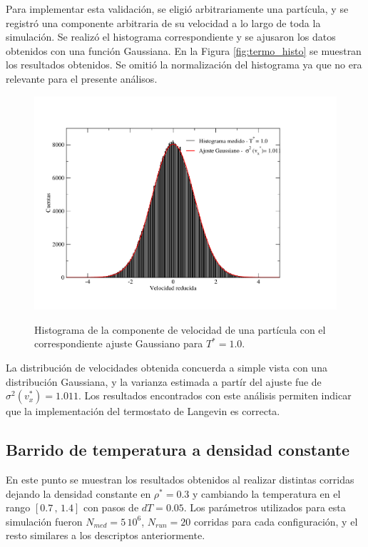 \documentclass[a4paper,12pt]{article}
\begin{document}
Para implementar esta validación, se eligió arbitrariamente una partícula, y se 
registró una componente arbitraria de su velocidad a lo largo de toda la 
simulación. Se realizó el histograma correspondiente y se ajusaron los datos 
obtenidos con una función Gaussiana. En la Figura \eqref{fig:termo_histo} se 
muestran los resultados obtenidos. Se omitió la normalización del histograma ya 
que no era relevante para el presente análisos.

\begin{figure}[H]\label{fig:termo_histo}
  \centering
\includegraphics[scale=0.6]{termo_histograma.pdf} \\
\vspace{-2em}
\caption{Histograma de la componente de velocidad de una partícula con el correspondiente ajuste Gaussiano para $T^*=1.0$.}\label{fig:termo_histo}
\end{figure}

La distribución de velocidades obtenida concuerda a simple vista con una 
distribución Gaussiana, y la varianza estimada a partír del ajuste fue de 
$\sigma^2(v_x^*) = 1.011$. Los resultados encontrados con este análisis 
permiten indicar que la implementación del termostato de Langevin es correcta.
	

\subsection{Barrido de temperatura a densidad constante}

En este punto se muestran los resultados obtenidos al realizar distintas 
corridas dejando la densidad constante en $\rho^*=0.3$ y cambiando la 
temperatura en el rango $[0.7\, , \, 1.4]$ con pasos de $dT=0.05$. Los 
parámetros utilizados para esta simulación fueron $N_{med} = 5\,10^6$, 
$N_{run} = 20$ corridas para cada configuración, y el resto similares a los 
descriptos anteriormente.
\end{document}

